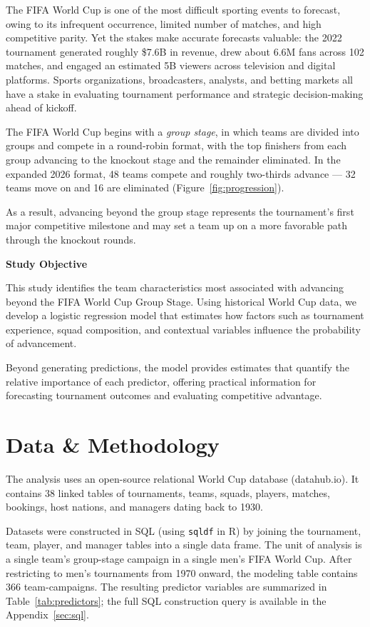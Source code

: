 \documentclass{article}
\begin{document}
The FIFA World Cup is one of the most difficult sporting events to forecast, owing to its infrequent occurrence, limited number of matches, and high competitive parity. Yet the stakes make accurate forecasts valuable: the 2022 tournament generated roughly \$7.6B in revenue, drew about 6.6M fans across 102 matches, and engaged an estimated 5B viewers across television and digital platforms. Sports organizations, broadcasters, analysts, and betting markets all have a stake in evaluating tournament performance and strategic decision-making ahead of kickoff.

The FIFA World Cup begins with a \emph{group stage}, in which teams are divided into groups and compete in a round-robin format, with the top finishers from each group advancing to the knockout stage and the remainder eliminated. In the expanded 2026 format, 48 teams compete and roughly two-thirds advance --- 32 teams move on and 16 are eliminated (Figure~\ref{fig:progression}).

As a result, advancing beyond the group stage represents the tournament's first major competitive milestone and may set a team up on a more favorable path through the knockout rounds.

\vspace{1.2em}

\textbf{\large Study Objective} 

This study identifies the team characteristics most associated with advancing beyond the FIFA World Cup Group Stage. Using historical World Cup data, we develop a logistic regression model that estimates how factors such as tournament experience, squad composition, and contextual variables influence the probability of advancement.

Beyond generating predictions, the model provides estimates that quantify the relative importance of each predictor, offering practical information for forecasting tournament outcomes and evaluating competitive advantage.




\section{Data \& Methodology}
The analysis uses an open-source relational World Cup database (datahub.io). It contains 38 linked tables of tournaments, teams, squads, players, matches, bookings, host nations, and managers dating back to 1930.

Datasets were constructed in SQL (using \texttt{sqldf} in R) by joining the tournament, team, player, and manager tables into a single data frame. The unit of analysis is a single team's group-stage campaign in a single men's FIFA World Cup. After restricting to men's tournaments from 1970 onward, the modeling table contains 366 team-campaigns. The resulting predictor variables are summarized in Table~\ref{tab:predictors}; the full SQL construction query is available in the Appendix~\ref{sec:sql}.  
\vspace{0.3 em}
\end{document}
